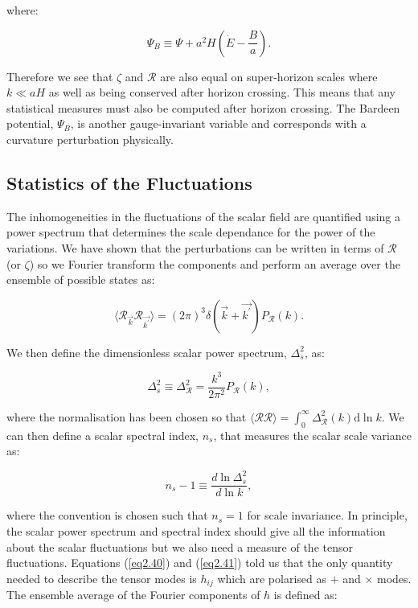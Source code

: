 \documentclass[a4paper,12pt,twoside]{report}
\begin{document}
where:

\begin{equation} \label{eq2.50}
\Psi_{B} \equiv \Psi + a^{2}H\left(\dot{E} - \frac{B}{a} \right).
\end{equation}

Therefore we see that $\zeta$ and $\mathcal{R}$ are also equal on super-horizon scales where $k \ll aH$ as well as being conserved after horizon crossing. This means that any statistical measures must also be computed after horizon crossing. The Bardeen potential, $\Psi_{B}$, is another gauge-invariant variable and corresponds with a curvature perturbation physically.

\subsection{Statistics of the Fluctuations} \label{subsec:StatFluc}

The inhomogeneities in the fluctuations of the scalar field are quantified using a power spectrum that determines the scale dependance for the power of the variations. We have shown that the perturbations can be written in terms of $\mathcal{R}$ (or $\zeta$) so we Fourier transform the components and perform an average over the ensemble of possible states as:

\begin{equation} \label{eq2.51}
\langle \mathcal{R}_{\vec{k}} \mathcal{R}_{\vec{k^{\prime}}} \rangle = (2 \pi)^{3} \delta(\vec{k} + \vec{k^{\prime}}) P_{\mathcal{R}}(k).
\end{equation}

We then define the dimensionless scalar power spectrum, $\Delta^{2}_{s}$, as:

\begin{equation} \label{eq2.52}
\Delta^{2}_{s} \equiv \Delta^{2}_{\mathcal{R}} = \frac{k^{3}}{2 \pi^{2}} P_{\mathcal{R}}(k),
\end{equation}

where the normalisation has been chosen so that $\langle \mathcal{R} \mathcal{R} \rangle = \int_{0}^{\infty} \Delta_{\mathcal{R}}^{2}(k) \mathrm{d}\ln k$. We can then define a scalar spectral index, $n_{s}$, that measures the scalar scale variance as:

\begin{equation} \label{eq2.53}
n_{s} - 1 \equiv \frac{d\ln \Delta^{2}_{s}}{d\ln k},
\end{equation}

where the convention is chosen such that $n_{s} = 1$ for scale invariance. In principle, the scalar power spectrum and spectral index should give all the information about the scalar fluctuations but we also need a measure of the tensor fluctuations. Equations (\ref{eq2.40}) and (\ref{eq2.41}) told us that the only quantity needed to describe the tensor modes is $h_{ij}$ which are polarised as $+$ and $\times$ modes. The ensemble average of the Fourier components of $h$ is defined as:
\end{document}
